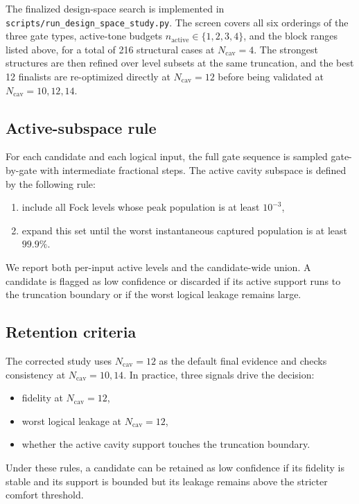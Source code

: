 ﻿\documentclass[aps,pra,twocolumn,reprint,amsmath,amssymb,floatfix]{revtex4-2}
\begin{document}
The finalized design-space search is implemented in
\texttt{scripts/run\_design\_space\_study.py}. The screen covers all six
orderings of the three gate types, active-tone budgets
$n_{\mathrm{active}}\in\{1,2,3,4\}$, and the block ranges listed above, for a
total of 216 structural cases at $N_{\mathrm{cav}}=4$. The strongest
structures are then refined over level subsets at the same truncation, and the
best 12 finalists are re-optimized directly at $N_{\mathrm{cav}}=12$ before
being validated at $N_{\mathrm{cav}}=10,12,14$.

\subsection{Active-subspace rule}

For each candidate and each logical input, the full gate sequence is sampled
gate-by-gate with intermediate fractional steps. The active cavity subspace is
defined by the following rule:
\begin{enumerate}
  \item include all Fock levels whose peak population is at least $10^{-3}$,
  \item expand this set until the worst instantaneous captured population is at
  least $99.9\%$.
\end{enumerate}
We report both per-input active levels and the candidate-wide union. A
candidate is flagged as low confidence or discarded if its active support runs
to the truncation boundary or if the worst logical leakage remains large.

\subsection{Retention criteria}

The corrected study uses $N_{\mathrm{cav}}=12$ as the default final evidence
and checks consistency at $N_{\mathrm{cav}}=10,14$. In practice, three signals
drive the decision:
\begin{itemize}
  \item fidelity at $N_{\mathrm{cav}}=12$,
  \item worst logical leakage at $N_{\mathrm{cav}}=12$,
  \item whether the active cavity support touches the truncation boundary.
\end{itemize}
Under these rules, a candidate can be retained as low confidence if its
fidelity is stable and its support is bounded but its leakage remains above the
stricter comfort threshold.
\end{document}
